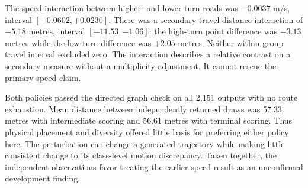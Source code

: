 
The speed interaction between higher- and lower-turn roads was $-0.0037$ m/s, interval $[-0.0602,+0.0230]$. There was a secondary travel-distance interaction of $-5.18$ metres, interval $[-11.53,-1.06]$: the high-turn point difference was $-3.13$ metres while the low-turn difference was $+2.05$ metres. Neither within-group travel interval excluded zero. The interaction describes a relative contrast on a secondary measure without a multiplicity adjustment. It cannot rescue the primary speed claim.

Both policies passed the directed graph check on all 2,151 outputs with no route exhaustion. Mean distance between independently returned draws was 57.33 metres with intermediate scoring and 56.61 metres with terminal scoring. Thus physical placement and diversity offered little basis for preferring either policy here. The perturbation can change a generated trajectory while making little consistent change to its class-level motion discrepancy. Taken together, the independent observations favor treating the earlier speed result as an unconfirmed development finding.
